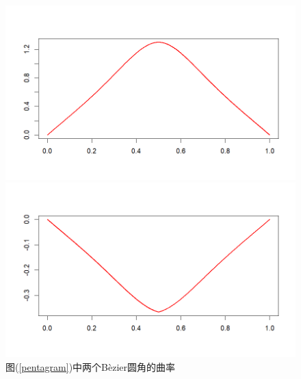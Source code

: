 \documentclass[utf8]{ctexart} %
\begin{document}
\begin{figure}
	\centering
	\begin{minipage}{0.49\linewidth}
		\centering
		\includegraphics[width=0.7\linewidth]{figures/Pentagram_Bezier1.png}
	\end{minipage}
	\begin{minipage}{0.49\linewidth}
		\centering
		\includegraphics[width=0.7\linewidth]{figures/Pentagram_Bezier2.png}
	\end{minipage}
\caption{\small{图(\ref{pentagram})中两个B\`ezier圆角的曲率}}
\end{figure}
\end{document}
